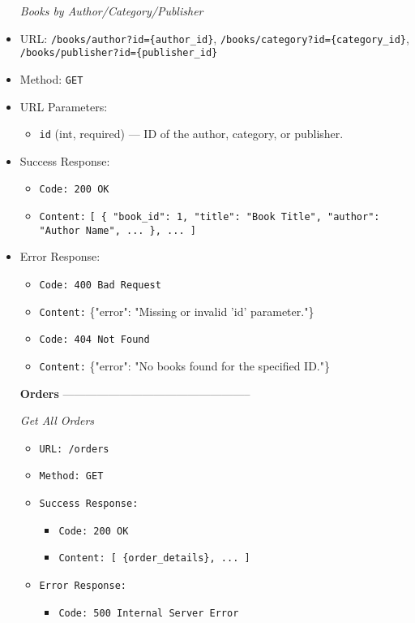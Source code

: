 \begin{itemize}
\begin{itemize}
\begin{itemize}
\begin{itemize}
\item[\textit{Books by Author/Category/Publisher}] 
\item URL: \texttt{/books/author?id=\{author\_id\}}, \texttt{/books/category?id=\{category\_id\}}, \texttt{/books/publisher?id=\{publisher\_id\}}  
\item Method: \texttt{GET}  
\item URL Parameters:
\begin{itemize}
  \item \texttt{id} (int, required) — ID of the author, category, or publisher.
\end{itemize}
\item Success Response:
\begin{itemize}
  \item \texttt{Code: 200 OK}  
  \item \texttt{Content:} \texttt{[ \{ "book\_id": 1, "title": "Book Title", "author": "Author Name", ... \}, ... ]}
\end{itemize}

\item Error Response:
\begin{itemize}
  \item \texttt{Code: 400 Bad Request}  
  \item \texttt{Content:} \{"error": "Missing or invalid 'id' parameter."\}
  
  \item \texttt{Code: 404 Not Found}  
  \item \texttt{Content:} \{"error": "No books found for the specified ID."\}
\end{itemize}

  \item[\textbf{Orders}] --------------------------------------------------

\item[\textit{Get All Orders}]
\begin{itemize}
  \item \texttt{URL: /orders}
  \item \texttt{Method: GET}
  \item \texttt{Success Response:}
    \begin{itemize}
      \item \texttt{Code: 200 OK}
      \item \texttt{Content: [ \{order\_details\}, ... ]}
    \end{itemize}
  \item \texttt{Error Response:}
    \begin{itemize}
      \item \texttt{Code: 500 Internal Server Error}
    \end{itemize}
\end{itemize}


\end{itemize}
\end{itemize}
\end{itemize}
\end{itemize}
